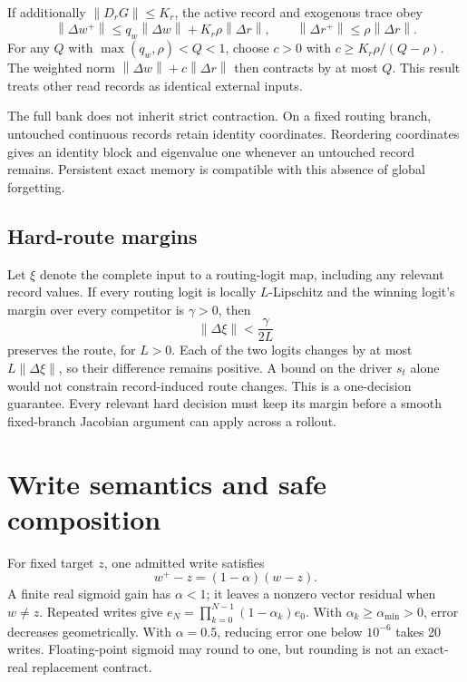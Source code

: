 \documentclass[11pt,a4paper]{article}
\newcommand{\norm}[1]{\left\lVert#1\right\rVert}
\begin{document}
If additionally \(\norm{D_rG}\le K_r\), the active record and exogenous trace
obey
\[
\norm{\Delta w^+}\le q_w\norm{\Delta w}+K_r\rho\norm{\Delta r},\qquad
\norm{\Delta r^+}\le\rho\norm{\Delta r}.
\]
For any \(Q\) with \(\max(q_w,\rho)<Q<1\), choose
\(c>0\) with \(c\ge K_r\rho/(Q-\rho)\). The weighted norm
\(\norm{\Delta w}+c\norm{\Delta r}\) then contracts by at most \(Q\).
This result treats other read records as identical external inputs.

The full bank does not inherit strict contraction. On a fixed routing branch,
untouched continuous records retain identity coordinates. Reordering coordinates
gives an identity block and eigenvalue one whenever an untouched record remains.
Persistent exact memory is compatible with this absence of global forgetting.

\subsection{Hard-route margins}
Let \(\xi\) denote the complete input to a routing-logit map, including any
relevant record values. If every routing logit is locally \(L\)-Lipschitz and the winning logit's margin
over every competitor is \(\gamma>0\), then
\begin{equation}
\norm{\Delta\xi}<\frac{\gamma}{2L}
\end{equation}
preserves the route, for \(L>0\). Each of the two logits changes by at most
\(L\norm{\Delta\xi}\), so their difference remains positive. A bound on the
driver \(s_t\) alone would not constrain record-induced route changes. This is a
one-decision guarantee. Every relevant hard decision must keep its margin
before a smooth fixed-branch Jacobian argument can apply across a rollout.

\section{Write semantics and safe composition}
For fixed target \(z\), one admitted write satisfies
\begin{equation}
w^+-z=(1-\alpha)(w-z).
\end{equation}
A finite real sigmoid gain has \(\alpha<1\); it leaves a nonzero vector residual
when \(w\ne z\). Repeated writes give
\(e_N=\prod_{k=0}^{N-1}(1-\alpha_k)e_0\). With
\(\alpha_k\ge\alpha_{\min}>0\), error decreases geometrically. With
\(\alpha=0.5\), reducing error one below \(10^{-6}\) takes 20 writes.
Floating-point sigmoid may round to one, but rounding is not an exact-real
replacement contract.
\end{document}
